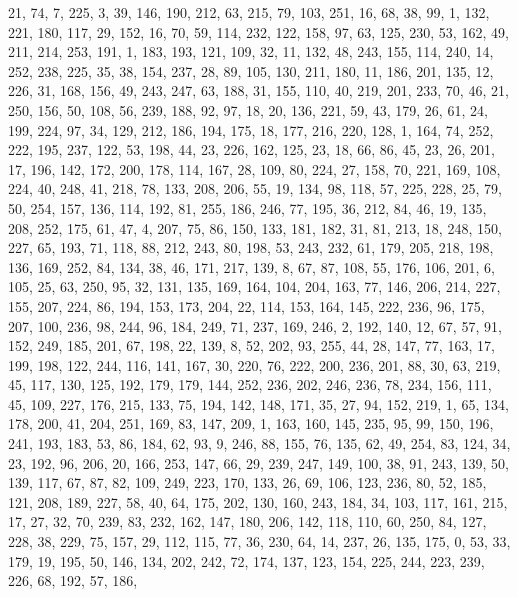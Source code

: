 \begin{DoxyCode}
       21, 74, 7, 225, 3, 39, 146, 190, 212, 63, 215, 79, 103, 251, 16, 68, 38, 99, 1, 132, 221, 180, 117, 29, 152,
       16, 70, 59, 114, 232, 122, 158, 97, 63, 125, 230, 53, 162, 49, 211, 214, 253, 191, 1, 183, 193, 121, 109,
       32, 11, 132, 48, 243, 155, 114, 240, 14, 252, 238, 225, 35, 38, 154, 237, 28, 89, 105, 130, 211, 180, 11, 186,
       201, 135, 12, 226, 31, 168, 156, 49, 243, 247, 63, 188, 31, 155, 110, 40, 219, 201, 233, 70, 46, 21, 250,
       156, 50, 108, 56, 239, 188, 92, 97, 18, 20, 136, 221, 59, 43, 179, 26, 61, 24, 199, 224, 97, 34, 129, 212,
       186, 194, 175, 18, 177, 216, 220, 128, 1, 164, 74, 252, 222, 195, 237, 122, 53, 198, 44, 23, 226, 162, 125,
       23, 18, 66, 86, 45, 23, 26, 201, 17, 196, 142, 172, 200, 178, 114, 167, 28, 109, 80, 224, 27, 158, 70, 221,
       169, 108, 224, 40, 248, 41, 218, 78, 133, 208, 206, 55, 19, 134, 98, 118, 57, 225, 228, 25, 79, 50, 254, 157,
       136, 114, 192, 81, 255, 186, 246, 77, 195, 36, 212, 84, 46, 19, 135, 208, 252, 175, 61, 47, 4, 207, 75, 86,
       150, 133, 181, 182, 31, 81, 213, 18, 248, 150, 227, 65, 193, 71, 118, 88, 212, 243, 80, 198, 53, 243, 232,
       61, 179, 205, 218, 198, 136, 169, 252, 84, 134, 38, 46, 171, 217, 139, 8, 67, 87, 108, 55, 176, 106, 201, 6,
       105, 25, 63, 250, 95, 32, 131, 135, 169, 164, 104, 204, 163, 77, 146, 206, 214, 227, 155, 207, 224, 86, 194,
       153, 173, 204, 22, 114, 153, 164, 145, 222, 236, 96, 175, 207, 100, 236, 98, 244, 96, 184, 249, 71, 237,
       169, 246, 2, 192, 140, 12, 67, 57, 91, 152, 249, 185, 201, 67, 198, 22, 139, 8, 52, 202, 93, 255, 44, 28, 147,
       77, 163, 17, 199, 198, 122, 244, 116, 141, 167, 30, 220, 76, 222, 200, 236, 201, 88, 30, 63, 219, 45, 117,
       130, 125, 192, 179, 179, 144, 252, 236, 202, 246, 236, 78, 234, 156, 111, 45, 109, 227, 176, 215, 133, 75,
       194, 142, 148, 171, 35, 27, 94, 152, 219, 1, 65, 134, 178, 200, 41, 204, 251, 169, 83, 147, 209, 1, 163, 160,
       145, 235, 95, 99, 150, 196, 241, 193, 183, 53, 86, 184, 62, 93, 9, 246, 88, 155, 76, 135, 62, 49, 254, 83,
       124, 34, 23, 192, 96, 206, 20, 166, 253, 147, 66, 29, 239, 247, 149, 100, 38, 91, 243, 139, 50, 139, 117,
       67, 87, 82, 109, 249, 223, 170, 133, 26, 69, 106, 123, 236, 80, 52, 185, 121, 208, 189, 227, 58, 40, 64, 175,
       202, 130, 160, 243, 184, 34, 103, 117, 161, 215, 17, 27, 32, 70, 239, 83, 232, 162, 147, 180, 206, 142, 118,
       110, 60, 250, 84, 127, 228, 38, 229, 75, 157, 29, 112, 115, 77, 36, 230, 64, 14, 237, 26, 135, 175, 0, 53,
       33, 179, 19, 195, 50, 146, 134, 202, 242, 72, 174, 137, 123, 154, 225, 244, 223, 239, 226, 68, 192, 57, 186,

\end{DoxyCode}
